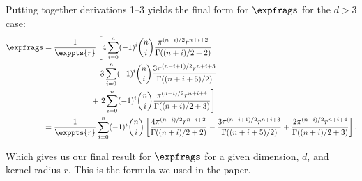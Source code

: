 Putting together derivations 1--3
yields the final form for $\expfrags$ for the $d>3$ case:
\begin{align*}
  \expfrags &= \frac{1}{\exppts{r}} \left[
        4 \sum_{i=0}^{n} (-1)^i {n \choose i} 
                           \frac{\pi^{(n-i)/2} r^{n+i+2}}{\Gamma((n+i)/2 + 2)} \right. \\
        & \qquad\qquad\qquad
        - 3 \sum_{i=0}^{n} (-1)^i {n \choose i}
                         \frac{3\pi^{(n-i+1)/2} r^{n+i+3}}
                              {\Gamma((n+i+5)/2)} \\
        & \qquad\qquad\qquad
        + \left. 2 \sum_{i=0}^{n}(-1)^i {n \choose i}
                          \frac{\pi^{(n-i)/2} r^{n+i+4}}
                               {\Gamma((n+i)/2+3)} \right] \\
       &= \frac{1}{\exppts{r}} 
        \sum_{i=0}^{n} (-1)^i {n \choose i} \left[
            \frac{4\pi^{(n-i)/2} r^{n+i+2}}{\Gamma((n+i)/2 + 2)}
          - \frac{3\pi^{(n-i+1)/2} r^{n+i+3}}{\Gamma((n+i+5)/2)}
          + \frac{2\pi^{(n-i)/2} r^{n+i+4}}{\Gamma((n+i)/2+3)} 
        \right]
        \text{.}
\end{align*}

Which gives us our final result for $\expfrags$ for a given dimension, $d$,
and kernel radius $r$.  This is the formula we used in the paper.

